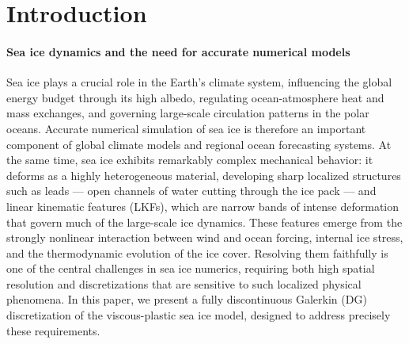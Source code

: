 \documentclass[11pt]{article}
\begin{document}
\section{Introduction}


\paragraph{Sea ice dynamics and the need for accurate numerical models}
Sea ice plays a crucial role in the Earth's climate system, influencing the global energy budget through its high albedo, regulating ocean-atmosphere heat and mass exchanges, and governing large-scale circulation patterns in the polar oceans. Accurate numerical simulation of sea ice is therefore an important component of global climate models and regional ocean forecasting systems. At the same time, sea ice exhibits remarkably complex mechanical behavior: it deforms as a highly heterogeneous material, developing sharp localized structures such as leads --- open channels of water cutting through the ice pack --- and linear kinematic features (LKFs), which are narrow bands of intense deformation that govern much of the large-scale ice dynamics. These features emerge from the strongly nonlinear interaction between wind and ocean forcing, internal ice stress, and the thermodynamic evolution of the ice cover. Resolving them faithfully is one of the central challenges in sea ice numerics, requiring both high spatial resolution and discretizations that are sensitive to such localized physical phenomena. In this paper, we present a fully discontinuous Galerkin (DG) discretization of the viscous-plastic sea ice model, designed to address precisely these requirements.
\end{document}
